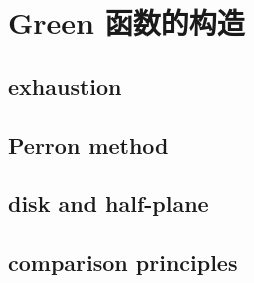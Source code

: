 \section{Green 函数的构造}
\label{b3:sec:1703}


\subsection{exhaustion}
\label{b3:subsec:170301}

\subsection{Perron method}
\label{b3:subsec:170302}

\subsection{disk and half-plane}
\label{b3:subsec:170303}

\subsection{comparison principles}
\label{b3:subsec:170304}


